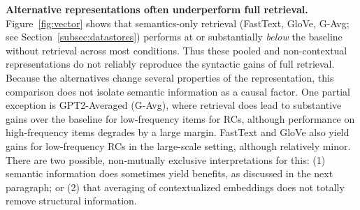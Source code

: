 \noindent \textbf{Alternative representations often underperform full retrieval.}
Figure~\ref{fig:vector} shows that semantics-only retrieval (FastText, GloVe, G-Avg; see Section~\ref{subsec:datastores}) performs at or substantially \textit{below} the baseline without retrieval across most conditions. Thus these pooled and non-contextual representations do not reliably reproduce the syntactic gains of full retrieval. Because the alternatives change several properties of the representation, this comparison does not isolate semantic information as a causal factor. One partial exception is GPT2-Averaged (G-Avg), where retrieval does lead to substantive gains over the baseline for low-frequency items for RCs, although performance on high-frequency items degrades by a large margin. FastText and GloVe also yield gains for low-frequency RCs in the large-scale setting, although relatively minor. There are two possible, non-mutually exclusive interpretations for this: (1) semantic information does sometimes yield benefits, as discussed in the next paragraph; or (2) that averaging of contextualized embeddings does not totally remove structural information.




